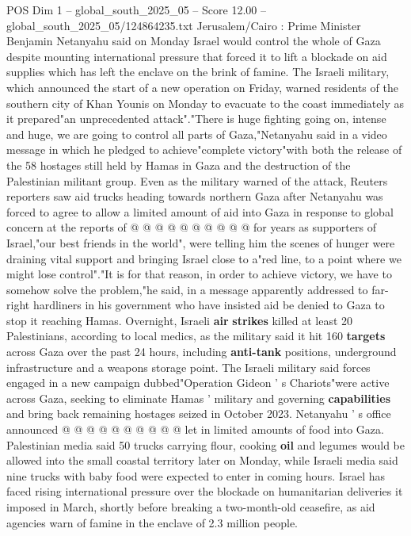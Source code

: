 \begin{textsample}{POS Dim 1 – global\_south\_2025\_05 – Score 12.00 – global\_south\_2025\_05/124864235.txt}  \label{ex:f1_pos_287}
Jerusalem/Cairo : Prime Minister Benjamin Netanyahu said on Monday Israel would control the whole of Gaza despite mounting international pressure that forced it to lift a blockade on aid supplies which has left the enclave on the brink of famine.
The Israeli military, which announced the start of a new operation on Friday, warned residents of the southern city of Khan Younis on Monday to evacuate to the coast immediately as it prepared"an unprecedented attack"."There is huge fighting going on, intense and huge, we are going to control all parts of Gaza,"Netanyahu said in a video message in which he pledged to achieve"complete victory"with both the release of the 58 hostages still held by Hamas in Gaza and the destruction of the Palestinian militant group.
Even as the military warned of the attack, Reuters reporters saw aid trucks heading towards northern Gaza after Netanyahu was forced to agree to allow a limited amount of aid into Gaza in response to global concern at the reports of @ @ @ @ @ @ @ @ @ @ for years as supporters of Israel,"our best friends in the world", were telling him the scenes of hunger were draining vital support and bringing Israel close to a"red line, to a point where we might lose control"."It is for that reason, in order to achieve victory, we have to somehow solve the problem,"he said, in a message apparently addressed to far-right hardliners in his government who have insisted aid be denied to Gaza to stop it reaching Hamas.
Overnight, Israeli \textbf{air} \textbf{strikes} killed at least 20 Palestinians, according to local medics, as the military said it hit 160 \textbf{targets} across Gaza over the past 24 hours, including \textbf{anti-tank} positions, underground infrastructure and a weapons storage point.
The Israeli military said forces engaged in a new campaign dubbed"Operation Gideon ' s Chariots"were active across Gaza, seeking to eliminate Hamas ' military and governing \textbf{capabilities} and bring back remaining hostages seized in October 2023.
Netanyahu ' s office announced @ @ @ @ @ @ @ @ @ @ let in limited amounts of food into Gaza.
Palestinian media said 50 trucks carrying flour, cooking \textbf{oil} and legumes would be allowed into the small coastal territory later on Monday, while Israeli media said nine trucks with baby food were expected to enter in coming hours.
Israel has faced rising international pressure over the blockade on humanitarian deliveries it imposed in March, shortly before breaking a two-month-old ceasefire, as aid agencies warn of famine in the enclave of 2.3 million people.

\end{textsample}
